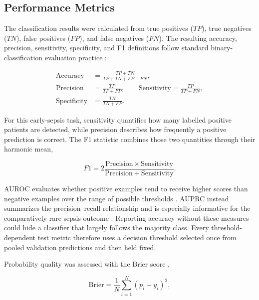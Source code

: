 \subsection{Performance Metrics}
\label{subsec:results-metrics}

The classification results were calculated from true positives ($TP$), true negatives ($TN$), false positives ($FP$), and false negatives ($FN$). The resulting accuracy, precision, sensitivity, specificity, and F1 definitions follow standard binary-classification evaluation practice \cite{powers2011evaluation}:

\begin{align}
    \mathrm{Accuracy} &= \frac{TP+TN}{TP+TN+FP+FN}, \label{eq:ch4-accuracy} \\
    \mathrm{Precision} &= \frac{TP}{TP+FP}, \qquad
    \mathrm{Sensitivity} = \frac{TP}{TP+FN}, \label{eq:ch4-precision-recall} \\
    \mathrm{Specificity} &= \frac{TN}{TN+FP}. \label{eq:ch4-specificity}
\end{align}

For this early-sepsis task, sensitivity quantifies how many labelled positive patients are detected, while precision describes how frequently a positive prediction is correct. The F1 statistic combines those two quantities through their harmonic mean,

\begin{equation}
    F1 = 2\frac{\mathrm{Precision}\times\mathrm{Sensitivity}}
    {\mathrm{Precision}+\mathrm{Sensitivity}}.
    \label{eq:ch4-f1}
\end{equation}

AUROC evaluates whether positive examples tend to receive higher scores than negative examples over the range of possible thresholds \cite{fawcett2006roc}. AUPRC instead summarizes the precision--recall relationship and is especially informative for the comparatively rare sepsis outcome \cite{saito2015precision}. Reporting accuracy without these measures could hide a classifier that largely follows the majority class. Every threshold-dependent test metric therefore uses a decision threshold selected once from pooled validation predictions and then held fixed.

Probability quality was assessed with the Brier score \cite{brier1950verification},

\begin{equation}
    \mathrm{Brier}=\frac{1}{N}\sum_{i=1}^{N}(p_i-y_i)^2,
    \label{eq:ch4-brier}
\end{equation}

